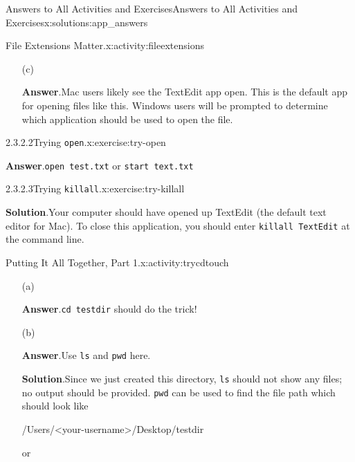 \documentclass[oneside,10pt,]{book}
\newcommand{\blocktitlefont}{\relax}
\newcommand{\mono}[1]{\texttt{#1}}
\begin{document}
\begin{solutions-chapter}{Answers to All Activities and Exercises}{}{Answers to All Activities and Exercises}{}{}{x:solutions:app_answers}
\begin{activitysolution}{2.1}{File Extensions Matter.}{x:activity:fileextensions}
\begin{enumerate}[font=\bfseries,label=(\alph*),ref=\alph*]
\item[(c)]\par\smallskip%
\noindent\textbf{\blocktitlefont Answer}.\hypertarget{g:answer:idm480554488-back}{}\quad{}Mac users likely see the TextEdit app open. This is the default app for opening files like this. Windows users will be prompted to determine which application should be used to open the file.%
\end{enumerate}
\end{activitysolution}%
\begin{inlinesolution}{2.3.2.2}{Trying \mono{open}.}{x:exercise:try-open}%
\par\smallskip%
\noindent\textbf{\blocktitlefont Answer}.\hypertarget{g:answer:idm480538360-back}{}\quad{}\mono{open test.txt} or \mono{start text.txt}%
\end{inlinesolution}%
\begin{inlinesolution}{2.3.2.3}{Trying \mono{killall}.}{x:exercise:try-killall}%
\par\smallskip%
\noindent\textbf{\blocktitlefont Solution}.\hypertarget{g:solution:idm480534520-back}{}\quad{}Your computer should have opened up TextEdit (the default text editor for Mac). To close this application, you should enter \mono{killall TextEdit} at the command line.%
\end{inlinesolution}%
\begin{activitysolution}{2.2}{Putting It All Together, Part 1.}{x:activity:trycdtouch}%
\begin{enumerate}[font=\bfseries,label=(\alph*),ref=\alph*]
\item[(a)]\par\smallskip%
\noindent\textbf{\blocktitlefont Answer}.\hypertarget{g:answer:idm480519416-back}{}\quad{}\mono{cd testdir} should do the trick!%
\item[(b)]\par\smallskip%
\noindent\textbf{\blocktitlefont Answer}.\hypertarget{g:answer:idm480519672-back}{}\quad{}Use \mono{ls} and \mono{pwd} here.%
\par\smallskip%
\noindent\textbf{\blocktitlefont Solution}.\hypertarget{g:solution:idm480514552-back}{}\quad{}Since we just created this directory, \mono{ls} should not show any files; no output should be provided. \mono{pwd} can be used to find the file path which should look like%
\begin{codedisplay}
/Users/<your-username>/Desktop/testdir
\end{codedisplay}
or%
\begin{codedisplay}

\end{codedisplay}
\end{enumerate}
\end{activitysolution}
\end{solutions-chapter}
\end{document}
